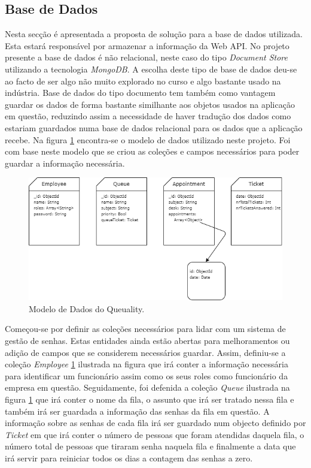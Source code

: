 \documentclass[12pt,a4paper]{article}
\begin{document}
\subsection{Base de Dados} \label{baseDeDadosReference}
Nesta secção é apresentada a proposta de solução para a base de dados utilizada. Esta estará responsável
por armazenar a informação da Web API. No projeto presente a base de dados é não relacional, neste caso do tipo
\textit{Document Store} utilizando a tecnologia \textit{MongoDB}\cite{mongoDBReference}. A escolha deste tipo de base de dados deu-se ao 
facto de ser algo não muito explorado no curso e algo bastante usado na indústria. Base de dados do tipo documento
tem também como vantagem guardar os dados de forma bastante similhante aos objetos usados na aplicação em questão, reduzindo 
assim a necessidade de haver tradução dos dados como estariam guardados numa base de dados relacional para os dados que a aplicação recebe.
Na figura \ref{fig:figure1} encontra-se o modelo de dados utilizado neste projeto. Foi com base neste modelo que se criou as coleções e campos necessários para poder 
guardar a informação necessária.\par
\begin{figure}[h]
    \centering
    \includegraphics[scale=0.75]{Data-Model}
    \caption{Modelo de Dados do Queuality.}
    \label{fig:figure1}
\end{figure}
Começou-se por definir as coleções necessários para lidar com um sistema de gestão de senhas. Estas entidades ainda estão abertas para melhoramentos ou adição de campos
que se considerem necessários guardar. Assim, definiu-se a coleção \textit{Employee} \ref{fig:figure1} ilustrada na figura que irá conter a informação necessária para identificar um funcionário assim 
como os seus roles como funcionário da empresa em questão. Seguidamente, foi defenida a coleção \textit{Queue} ilustrada na figura \ref{fig:figure1} que irá conter o nome da fila, o assunto que irá ser tratado nessa fila
e também irá ser guardada a informação das senhas da fila em questão. A informação sobre as senhas de cada fila irá ser guardado num objecto definido por \textit{Ticket} em que irá conter o número de pessoas que foram atendidas
daquela fila, o número total de pessoas que tiraram senha naquela fila e finalmente a data que irá servir para reiniciar todos os dias a contagem das senhas a zero.
\end{document}
